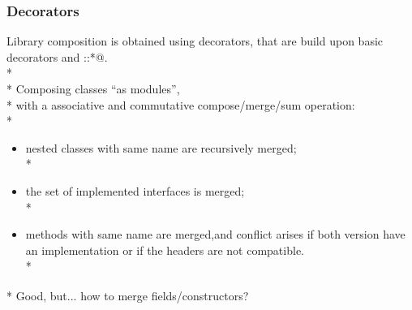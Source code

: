 %
%
%
%
%


\begin{frame}[fragile]
\frametitle{Decorators}

Library composition is obtained using decorators, that are build upon 
basic decorators \Q@Compose@ and \Q@Refactor::*@.\\*
${}_{}$\\*
Composing classes ``as modules'',\\*
\PresentationOnly\pause with a associative and commutative compose/merge/sum
operation:\\*
\begin{itemize}
\PresentationOnly\pause\item nested classes with same name are recursively merged;\\*
\PresentationOnly\pause\item the set of implemented interfaces is merged;\\*
\PresentationOnly\pause\item methods with same name are merged,\PresentationOnly\pause and conflict arises if both version have an implementation or if the headers are not compatible.\\*
\end{itemize}
${}_{}$\\*
\PresentationOnly\pause Good, but... how to merge fields/constructors?

\end{frame}


